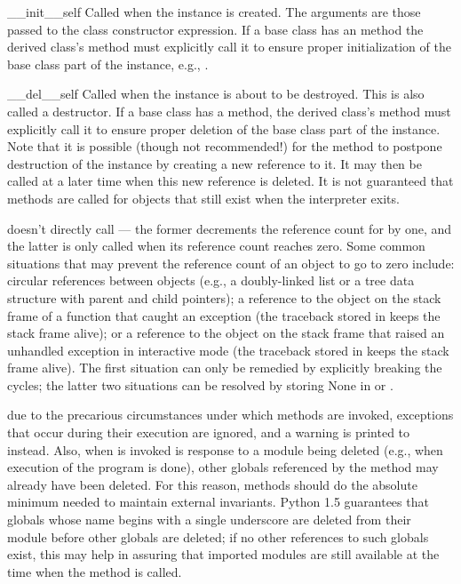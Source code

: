 \begin{methoddescni}{__init__}{self}
Called when the instance is created.  The arguments are those passed
to the class constructor expression.  If a base class has an
 method the derived class's  method must
explicitly call it to ensure proper initialization of the base class
part of the instance, e.g., .
\end{methoddescni}


\begin{methoddescni}{__del__}{self}
Called when the instance is about to be destroyed.  This is also
called a destructor.  If a base class
has a  method, the derived class's  method
must explicitly call it to ensure proper deletion of the base class
part of the instance.  Note that it is possible (though not recommended!)
for the 
method to postpone destruction of the instance by creating a new
reference to it.  It may then be called at a later time when this new
reference is deleted.  It is not guaranteed that
 methods are called for objects that still exist when
the interpreter exits.

  doesn't directly call
 --- the former decrements the reference count for
 by one, and the latter is only called when its reference
count reaches zero.  Some common situations that may prevent the
reference count of an object to go to zero include: circular
references between objects (e.g., a doubly-linked list or a tree data
structure with parent and child pointers); a reference to the object
on the stack frame of a function that caught an exception (the
traceback stored in  keeps the stack frame
alive); or a reference to the object on the stack frame that raised an
unhandled exception in interactive mode (the traceback stored in
 keeps the stack frame alive).  The first
situation can only be remedied by explicitly breaking the cycles; the
latter two situations can be resolved by storing None in
 or .

 due to the precarious circumstances under which
 methods are invoked, exceptions that occur during their
execution are ignored, and a warning is printed to 
instead.  Also, when  is invoked is response to a module
being deleted (e.g., when execution of the program is done), other
globals referenced by the  method may already have been
deleted.  For this reason,  methods should do the
absolute minimum needed to maintain external invariants.  Python 1.5
guarantees that globals whose name begins with a single underscore are
deleted from their module before other globals are deleted; if no
other references to such globals exist, this may help in assuring that
imported modules are still available at the time when the
 method is called. 
\end{methoddescni}

